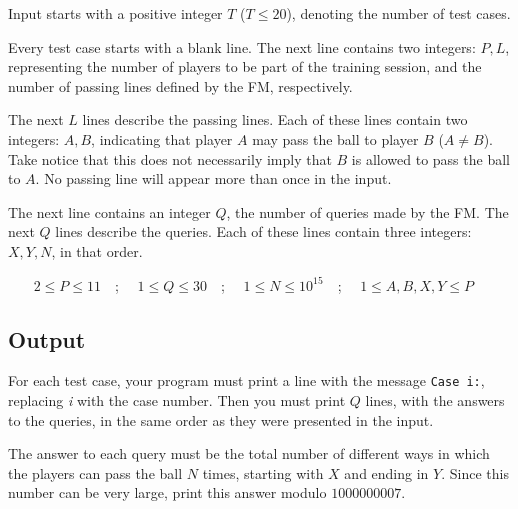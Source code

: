 \documentclass[12pt]{article}
\begin{document}
Input starts with a positive integer $T$ ($T \leq 20$), denoting the
number of test cases.

Every test case starts with a blank line. The next line contains two
integers: $P, L$, representing the number of players to be part of the
training session, and the number of passing lines defined by the FM,
respectively.

The next $L$ lines describe the passing lines. Each of these lines
contain two integers: $A, B$, indicating that player $A$ may pass the
ball to player $B$ ($A \neq B$). Take notice that this does not
necessarily imply that $B$ is allowed to pass the ball to $A$. No
passing line will appear more than once in the input.

The next line contains an integer $Q$, the number of queries made by the
FM. The next $Q$ lines describe the queries. Each of these lines contain
three integers: $X, Y, N$, in that order.

~~~ $2 \leq P \leq 11$~~; ~~$1 \leq Q \leq 30$~~;
~~$1 \leq N \leq 10^{15}$~~; ~~$1 \leq A, B, X, Y \leq P$

\subsection{Output}\label{output}

For each test case, your program must print a line with the message
\texttt{Case i:}, replacing \emph{i} with the case number. Then you must
print $Q$ lines, with the answers to the queries, in the same order as
they were presented in the input.

The answer to each query must be the total number of different ways in
which the players can pass the ball $N$ times, starting with $X$ and
ending in $Y$. Since this number can be very large, print this answer
modulo $1000000007$.

\paragraph{}

\vspace{-20pt}

\noindent
\end{document}
